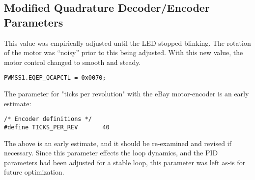 \subsection{Modified Quadrature Decoder/Encoder Parameters}
    
This value was empirically adjusted until the LED stopped blinking.
The rotation of the motor was ``noisy'' prior to this being adjusted.
With this new value, the motor control changed to smooth and steady.
    
\begin{verbatim}
PWMSS1.EQEP_QCAPCTL = 0x0070;
\end{verbatim}

The parameter for "ticks per revolution" with the eBay motor-encoder is an early estimate:

\begin{verbatim}
/* Encoder definitions */
#define TICKS_PER_REV       40
\end{verbatim}

The above is an early estimate, and it should be re-examined and revised if necessary.  Since this parameter effects the loop dynamics, and the PID parameters had been adjusted for a stable loop, this parameter was left as-is for future optimization.


